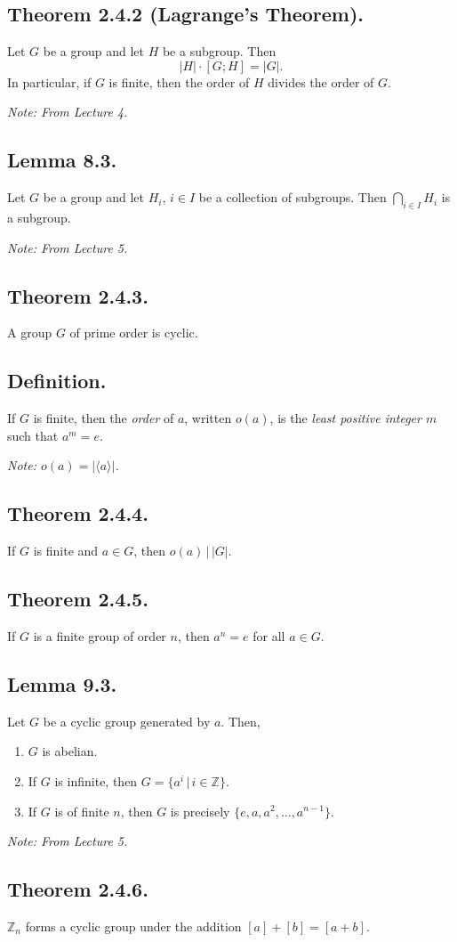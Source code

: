 \documentclass{article}
\newenvironment{thm}[1]{\subsection*{Theorem #1.}}{}
\newenvironment{lemma}[1]{\subsection*{Lemma #1.}}{}
\newenvironment{defn}{\subsection*{Definition.}}{}
\newcommand*{\Z}{\mathbb{Z}}
\begin{document}
\begin{thm}{2.4.2 (Lagrange's Theorem)}
    Let $G$ be a group and let $H$ be a subgroup. Then
    \[
        |H| \cdot [G; H] = |G|.
    \]
    In particular, if $G$ is finite, then the order of $H$ divides the order of $G$.

    \textit{Note: From Lecture 4.}
\end{thm}

\begin{lemma}{8.3}
    Let $G$ be a group and let $H_i$, $i \in I$ be a collection of subgroups. 
    Then $\bigcap_{i \in I} H_i$ is a subgroup.

    \textit{Note: From Lecture 5.}
\end{lemma}

\begin{thm}{2.4.3}
    A group $G$ of prime order is cyclic.
\end{thm}

\begin{defn}
    If $G$ is finite, then the \textit{order} of $a$, written $o(a)$, 
    is the \textit{least positive integer $m$} such that $a^m = e$.

    \textit{Note: $o(a) = |\langle a \rangle|$.}
\end{defn}

\begin{thm}{2.4.4}
    If $G$ is finite and $a \in G$, then $o(a) \, | \, |G|$.
\end{thm}

\begin{thm}{2.4.5}
    If $G$ is a finite group of order $n$, then $a^n = e$ for all $a \in G$.
\end{thm}

\begin{lemma}{9.3}
    Let $G$ be a cyclic group generated by $a$. Then,
    \begin{enumerate}[label=(\alph*)]
        \item $G$ is abelian.
        \item If $G$ is infinite, then $G = \{a^i \, | \, i \in \Z\}$.
        \item If $G$ is of finite $n$, then $G$ is precisely $\{e, a, a^2, \dots, a^{n - 1}\}$.
    \end{enumerate}

    \textit{Note: From Lecture 5.}
\end{lemma}

\begin{thm}{2.4.6}
    $\Z_n$ forms a cyclic group under the addition $[a] + [b] = [a + b]$.
\end{thm}
\end{document}

